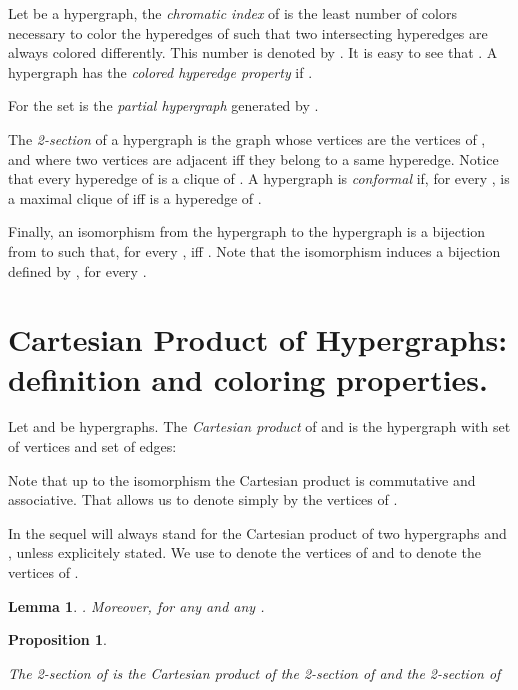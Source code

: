 \documentclass[copyright]{eptcs}
\newtheorem{Lem}{Lemma}
\newtheorem{Prop}{Proposition}
\newcommand{\suppr}[1]{}
\begin{document}
Let  be a hypergraph, the \emph{chromatic index} of  is the least number of colors necessary to color the hyperedges of  such that two intersecting hyperedges are always colored differently. This number is denoted by . It is easy to see that . A hypergraph  has the \emph{colored hyperedge property} if  .

For  the set  is the \emph{partial hypergraph} generated by . 

The \emph{2-section}  of a hypergraph  is the graph
whose vertices are the vertices of , and where two vertices are
adjacent iff they belong to a same hyperedge. Notice that every
hyperedge of  is a clique of . A hypergraph  is
\emph{conformal} if, for every ,  is a
maximal clique of  iff  is a hyperedge of .

Finally, an isomorphism from the hypergraph  to the
hypergraph  is a bijection from  to  such that,
for every ,  iff . Note that the isomorphism  induces a bijection  defined by , for
every .

\section{Cartesian Product of  Hypergraphs: definition and coloring properties.}

Let  and  
be hypergraphs. The \emph{Cartesian product} of  and  is the hypergraph  with set of vertices
 and set of edges:


Note that up to the isomorphism the Cartesian product is
commutative and associative. That allows us to denote simply by
 the vertices of .
\suppr{SE REPETE AVEC LA PREUVE DU LEMME Note also that a
hyperedge  of  and a hyperedge  of  have a non-empty intersection iff  and
. In that case .}


In the sequel  will always stand for the Cartesian product of two hypergraphs  and , unless explicitely stated. We use  to denote the vertices of  and  to denote the vertices of .

\begin{Lem}\label{Fond}
. Moreover,  for any  and any .
\end{Lem}





\begin{Prop}\label{Prop2Section}

The 2-section of  is the Cartesian product of the 2-section of  and the 2-section of 
\end{Prop}
\end{document}
